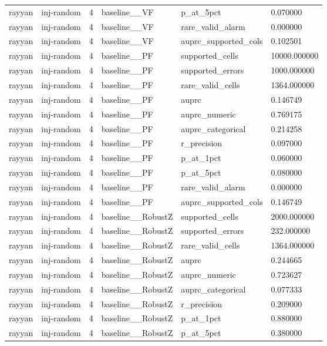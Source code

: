 \begin{tabular}{llllll}
rayyan & inj-random & 4 & baseline\_\_VF & p\_at\_5pct & 0.070000 \\
rayyan & inj-random & 4 & baseline\_\_VF & rare\_valid\_alarm & 0.000000 \\
rayyan & inj-random & 4 & baseline\_\_VF & auprc\_supported\_cols & 0.102501 \\
rayyan & inj-random & 4 & baseline\_\_PF & supported\_cells & 10000.000000 \\
rayyan & inj-random & 4 & baseline\_\_PF & supported\_errors & 1000.000000 \\
rayyan & inj-random & 4 & baseline\_\_PF & rare\_valid\_cells & 1364.000000 \\
rayyan & inj-random & 4 & baseline\_\_PF & auprc & 0.146749 \\
rayyan & inj-random & 4 & baseline\_\_PF & auprc\_numeric & 0.769175 \\
rayyan & inj-random & 4 & baseline\_\_PF & auprc\_categorical & 0.214258 \\
rayyan & inj-random & 4 & baseline\_\_PF & r\_precision & 0.097000 \\
rayyan & inj-random & 4 & baseline\_\_PF & p\_at\_1pct & 0.060000 \\
rayyan & inj-random & 4 & baseline\_\_PF & p\_at\_5pct & 0.080000 \\
rayyan & inj-random & 4 & baseline\_\_PF & rare\_valid\_alarm & 0.000000 \\
rayyan & inj-random & 4 & baseline\_\_PF & auprc\_supported\_cols & 0.146749 \\
rayyan & inj-random & 4 & baseline\_\_RobustZ & supported\_cells & 2000.000000 \\
rayyan & inj-random & 4 & baseline\_\_RobustZ & supported\_errors & 232.000000 \\
rayyan & inj-random & 4 & baseline\_\_RobustZ & rare\_valid\_cells & 1364.000000 \\
rayyan & inj-random & 4 & baseline\_\_RobustZ & auprc & 0.244665 \\
rayyan & inj-random & 4 & baseline\_\_RobustZ & auprc\_numeric & 0.723627 \\
rayyan & inj-random & 4 & baseline\_\_RobustZ & auprc\_categorical & 0.077333 \\
rayyan & inj-random & 4 & baseline\_\_RobustZ & r\_precision & 0.209000 \\
rayyan & inj-random & 4 & baseline\_\_RobustZ & p\_at\_1pct & 0.880000 \\
rayyan & inj-random & 4 & baseline\_\_RobustZ & p\_at\_5pct & 0.380000 \\

\end{tabular}
